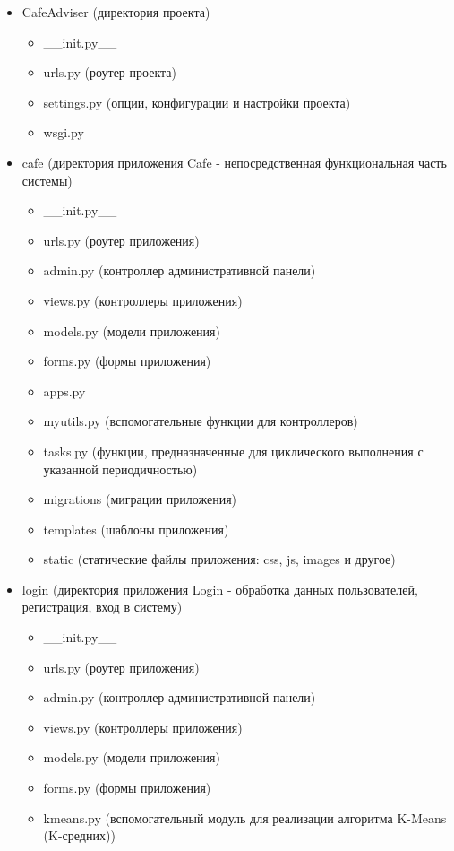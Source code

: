 \begin{itemize}
	\item CafeAdviser (директория проекта)
	\begin{itemize}
		\item \_\_init.py\_\_
		\item urls.py (роутер проекта)
		\item settings.py (опции, конфигурации и настройки проекта)
		\item wsgi.py
	\end{itemize}
	\item cafe (директория приложения Cafe - непосредственная функциональная часть системы)
	\begin{itemize}
		\item \_\_init.py\_\_
		\item urls.py (роутер приложения)
		\item admin.py (контроллер административной панели)
		\item views.py (контроллеры приложения)
		\item models.py (модели приложения)
		\item forms.py (формы приложения)
		\item apps.py
		\item myutils.py (вспомогательные функции для контроллеров)
		\item tasks.py (функции, предназначенные для циклического выполнения с указанной периодичностью)
		\item migrations (миграции приложения)
		\item templates (шаблоны приложения)
		\item static (статические файлы приложения: css, js, images и другое)
	\end{itemize}
    \item login (директория приложения Login - обработка данных пользователей, регистрация, вход в систему)
    \begin{itemize}
    	\item \_\_init.py\_\_
    	\item urls.py (роутер приложения)
    	\item admin.py (контроллер административной панели)
    	\item views.py (контроллеры приложения)
    	\item models.py (модели приложения)
    	\item forms.py (формы приложения)
    	\item kmeans.py (вспомогательный модуль для реализации алгоритма K-Means (K-средних))

\end{itemize}
\end{itemize}
